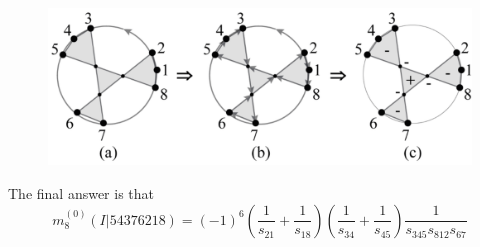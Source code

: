 \documentclass{beamer}
\begin{document}
\begin{frame}
    
    \begin{figure}
        \centering
        \includegraphics[width=1\linewidth]{6.png}
    \end{figure}
    The final answer is that
    \begin{equation*}
        m_8^{(0)}(I|54376218)=(-1)^6\left(\frac{1}{s_{21}}+\frac{1}{s_{18}}\right)\left(\frac{1}{s_{34}}+\frac{1}{s_{45}}\right)\frac{1}{s_{345}s_{812}s_{67}}
    \end{equation*}
\end{frame}
\end{document}
